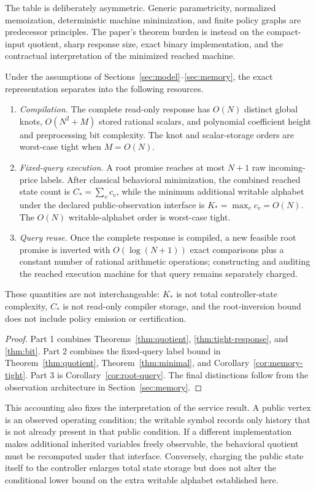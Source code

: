 The table is deliberately asymmetric. Generic parametricity, normalized memoization, deterministic machine minimization, and finite policy graphs are predecessor principles. The paper's theorem burden is instead on the compact-input quotient, sharp response size, exact binary implementation, and the contractual interpretation of the minimized reached machine.

\begin{proposition}\label{prop:three-layer-accounting}
Under the assumptions of Sections~\ref{sec:model}--\ref{sec:memory}, the exact representation separates into the following resources.
\begin{enumerate}
\item \emph{Compilation.} The complete read-only response has $O(N)$ distinct global knots, $O(N^2+M)$ stored rational scalars, and polynomial coefficient height and preprocessing bit complexity. The knot and scalar-storage orders are worst-case tight when $M=O(N)$.
\item \emph{Fixed-query execution.} A root promise reaches at most $N+1$ raw incoming-price labels. After classical behavioral minimization, the combined reached state count is $C_*=\sum_v c_v$, while the minimum additional writable alphabet under the declared public-observation interface is $K_*=\max_v c_v=O(N)$. The $O(N)$ writable-alphabet order is worst-case tight.
\item \emph{Query reuse.} Once the complete response is compiled, a new feasible root promise is inverted with $O(\log(N+1))$ exact comparisons plus a constant number of rational arithmetic operations; constructing and auditing the reached execution machine for that query remains separately charged.
\end{enumerate}
These quantities are not interchangeable: $K_*$ is not total controller-state complexity, $C_*$ is not read-only compiler storage, and the root-inversion bound does not include policy emission or certification.
\end{proposition}
\begin{proof}
Part 1 combines Theorems~\ref{thm:quotient}, \ref{thm:tight-response}, and \ref{thm:bit}. Part 2 combines the fixed-query label bound in Theorem~\ref{thm:quotient}, Theorem~\ref{thm:minimal}, and Corollary~\ref{cor:memory-tight}. Part 3 is Corollary~\ref{cor:root-query}. The final distinctions follow from the observation architecture in Section~\ref{sec:memory}.
\end{proof}

This accounting also fixes the interpretation of the service result. A public vertex is an observed operating condition; the writable symbol records only history that is not already present in that public condition. If a different implementation makes additional inherited variables freely observable, the behavioral quotient must be recomputed under that interface. Conversely, charging the public state itself to the controller enlarges total state storage but does not alter the conditional lower bound on the extra writable alphabet established here.
